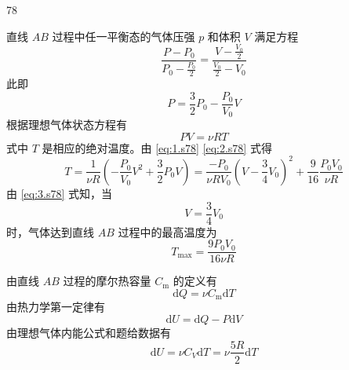 \begin{solution}{78}
    \begin{subsolution}
        直线 $AB$ 过程中任一平衡态的气体压强 $p$ 和体积 $V$ 满足方程
        \begin{equation}
            \frac{P - P_{0}}{P_{0} - \frac{P_{0}}{2}} = \frac{V - \frac{V_{0}}{2}}{\frac{V_{0}}{2} - V_{0}}
        \end{equation}
        此即
        \begin{equation}
            P = \frac{3}{2} P_{0} - \frac{P_{0}}{V_{0}} V
            \label{eq:1.s78}
        \end{equation}
        根据理想气体状态方程有
        \begin{equation}
            P V = \nu R T
            \label{eq:2.s78}
        \end{equation}
        式中 $T$ 是相应的绝对温度。由 \eqref{eq:1.s78} \eqref{eq:2.s78} 式得
        \begin{equation}
            T = \frac{1}{\nu R} \left(- \frac{P_{0}}{V_{0}} V^{2} + \frac{3}{2} P_{0} V\right) = \frac{- P_{0}}{\nu R V_{0}} \left(V - \frac{3}{4} V_{0}\right)^{2} + \frac{9}{16} \frac{P_{0} V_{0}}{\nu R}
            \label{eq:3.s78}
        \end{equation}
        由 \eqref{eq:3.s78} 式知，当
        \begin{equation}
            V = \frac{3}{4} V_{0}
            \label{eq:4.s78}
        \end{equation}
        时，气体达到直线 $AB$ 过程中的最高温度为
        \begin{equation}
            T_{\max} = \frac{9 P_{0} V_{0}}{16 \nu R}
            \label{eq:5.s78}
        \end{equation}
    \end{subsolution}
    \begin{subsolution}
        由直线 $AB$ 过程的摩尔热容量 $C_{\mathrm{m}}$ 的定义有
        \begin{equation}
            \mathrm{d} Q = \nu C_{\mathrm{m}} \mathrm{d} T
            \label{eq:6.s78}
        \end{equation}
        由热力学第一定律有
        \begin{equation}
            \mathrm{d} U = \mathrm{d} Q - P \mathrm{d} V
            \label{eq:7.s78}
        \end{equation}
        由理想气体内能公式和题给数据有
        \begin{equation}
            \mathrm{d} U = \nu C_{V} \mathrm{d} T = \nu \frac{5 R}{2} \mathrm{d} T

\end{equation}
\end{subsolution}
\end{solution}
